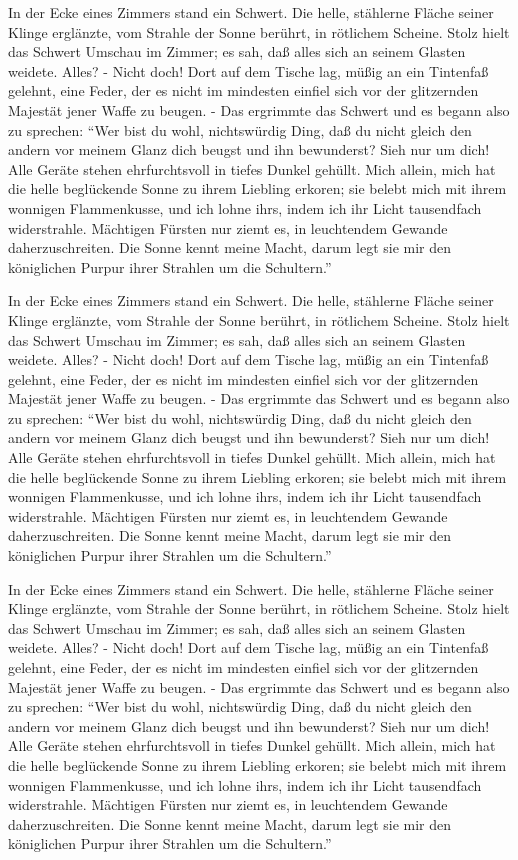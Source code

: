 In der Ecke eines Zimmers stand ein Schwert. Die helle, stählerne Fläche seiner
Klinge erglänzte, vom Strahle der Sonne berührt, in rötlichem Scheine. Stolz
hielt das Schwert Umschau im Zimmer; es sah, daß alles sich an seinem Glasten
weidete. Alles? - Nicht doch! Dort auf dem Tische lag, müßig an ein Tintenfaß
gelehnt, eine Feder, der es nicht im mindesten einfiel sich vor der
glitzernden Majestät jener Waffe zu beugen. - Das ergrimmte das Schwert und es
begann also zu sprechen: \enquote{Wer bist du wohl, nichtswürdig Ding, daß du nicht
gleich den andern vor meinem Glanz dich beugst und ihn bewunderst? Sieh nur
um dich! Alle Geräte stehen ehrfurchtsvoll in tiefes Dunkel gehüllt. Mich
allein, mich hat die helle beglückende Sonne zu ihrem Liebling erkoren; sie
belebt mich mit ihrem wonnigen Flammenkusse, und ich lohne ihrs, indem ich ihr
Licht tausendfach widerstrahle. Mächtigen Fürsten nur ziemt es, in leuchtendem
Gewande daherzuschreiten. Die Sonne kennt meine Macht, darum legt sie mir den
königlichen Purpur ihrer Strahlen um die Schultern.}

In der Ecke eines Zimmers stand ein Schwert. Die helle, stählerne Fläche seiner
Klinge erglänzte, vom Strahle der Sonne berührt, in rötlichem Scheine. Stolz
hielt das Schwert Umschau im Zimmer; es sah, daß alles sich an seinem Glasten
weidete. Alles? - Nicht doch! Dort auf dem Tische lag, müßig an ein Tintenfaß
gelehnt, eine Feder, der es nicht im mindesten einfiel sich vor der
glitzernden Majestät jener Waffe zu beugen. - Das ergrimmte das Schwert und es
begann also zu sprechen: \enquote{Wer bist du wohl, nichtswürdig Ding, daß du nicht
gleich den andern vor meinem Glanz dich beugst und ihn bewunderst? Sieh nur
um dich! Alle Geräte stehen ehrfurchtsvoll in tiefes Dunkel gehüllt. Mich
allein, mich hat die helle beglückende Sonne zu ihrem Liebling erkoren; sie
belebt mich mit ihrem wonnigen Flammenkusse, und ich lohne ihrs, indem ich ihr
Licht tausendfach widerstrahle. Mächtigen Fürsten nur ziemt es, in leuchtendem
Gewande daherzuschreiten. Die Sonne kennt meine Macht, darum legt sie mir den
königlichen Purpur ihrer Strahlen um die Schultern.}

In der Ecke eines Zimmers stand ein Schwert. Die helle, stählerne Fläche seiner
Klinge erglänzte, vom Strahle der Sonne berührt, in rötlichem Scheine. Stolz
hielt das Schwert Umschau im Zimmer; es sah, daß alles sich an seinem Glasten
weidete. Alles? - Nicht doch! Dort auf dem Tische lag, müßig an ein Tintenfaß
gelehnt, eine Feder, der es nicht im mindesten einfiel sich vor der
glitzernden Majestät jener Waffe zu beugen. - Das ergrimmte das Schwert und es
begann also zu sprechen: \enquote{Wer bist du wohl, nichtswürdig Ding, daß du nicht
gleich den andern vor meinem Glanz dich beugst und ihn bewunderst? Sieh nur
um dich! Alle Geräte stehen ehrfurchtsvoll in tiefes Dunkel gehüllt. Mich
allein, mich hat die helle beglückende Sonne zu ihrem Liebling erkoren; sie
belebt mich mit ihrem wonnigen Flammenkusse, und ich lohne ihrs, indem ich ihr
Licht tausendfach widerstrahle. Mächtigen Fürsten nur ziemt es, in leuchtendem
Gewande daherzuschreiten. Die Sonne kennt meine Macht, darum legt sie mir den
königlichen Purpur ihrer Strahlen um die Schultern.}

